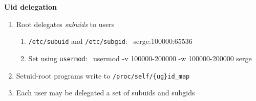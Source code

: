 \documentclass{beamer}
\begin{document}
\begin{frame}
\textbf{Uid delegation}
\begin{enumerate}
\item Root delegates {\em subuids} to users
	\begin{enumerate}
	\item {\tt /etc/subuid} and {\tt /etc/subgid}: \
serge:100000:65536
	\item Set using {\tt usermod}: \
usermod -v 100000-200000 -w 100000-200000 serge
	\end{enumerate}
\item Setuid-root programs write to {\tt /proc/self/\{ug\}id\_map}
\item Each user may be delegated a set of subuids and subgids
\end{enumerate}
\end{frame}

\end{document}
